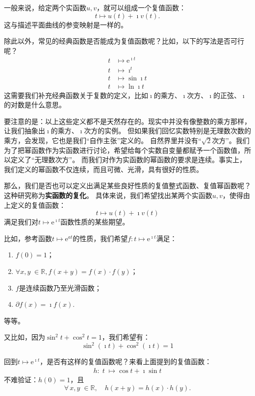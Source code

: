 \documentclass[12pt,UTF8]{ctexbook}
\newcommand{\e}{\mathrm{e}}
\theoremstyle{definition}
\theoremstyle{plain}
\begin{document}
一般来说，给定两个实函数$u,v$，就可以组成一个复值函数：
$$ t\mapsto u(t) + \imath v(t).$$
这与描述平面曲线的参变映射是一样的。

除此以外，常见的经典函数是否能成为复值函数呢？比如，以下的写法是否可行呢？
\begin{align*}
    t &\mapsto \e^{\imath t} \\
    t &\mapsto \imath^t \\
    t &\mapsto \sin{\imath t} \\
    t &\mapsto \ln{\imath t} 
\end{align*}
这需要我们补充经典函数关于复数的定义，比如$\imath$的乘方、$\imath$次方、$\imath$的正弦、$\imath$的对数是什么意思。

要注意的是：以上这些定义都不是天然存在的。现实中并没有像整数的乘方那样，让我们抽象出$\imath$的乘方、$\imath$次方的实例。
但如果我们回忆实数特别是无理数次数的乘方，会发现，它也是我们“自作主张”定义的。
自然界里并没有“$\sqrt{2}$次方”。我们为了把幂函数作为实函数进行讨论，希望给每个实数自变量都赋予一个函数值，所以定义了“无理数次方”。
而我们对作为实函数的幂函数的要求是连续。事实上，我们定义的幂函数不仅连续，而且可微、光滑，具有很好的性质。

那么，我们是否也可以定义出满足某些良好性质的复值整式函数、复值幂函数呢？这种研究称为\textbf{实函数的复化}。
具体来说，我们希望找出某两个实函数$u,v$，使得由上定义的复值函数：
$$ t\mapsto u(t) + \imath v(t)$$
满足我们对$t\mapsto \e^{\imath t}$函数性质的某些期望。

比如，参考函数$t\mapsto \e^{at}$的性质，我们希望$f: t\mapsto \e^{\imath t}$满足：
\begin{enumerate}
    \item $f(0) = 1$；
    \item $\forall x, y \; \in \mathbb{R}, f(x + y) = f(x)\cdot f(y)$；
    \item $f$是连续函数乃至光滑函数；
    \item $\partial f(x) = \imath f(x).$
\end{enumerate}
等等。

又比如，因为$\sin^2{t} + \cos^2{t} = 1$，我们希望有：
$$ \sin^2{(\imath t)} + \cos^2{(\imath t)} = 1 $$

回到$t\mapsto \e^{\imath t}$，是否有这样的复值函数呢？来看上面提到的复值函数：
\begin{align*}
    h: \;t \;\mapsto \cos{t} + \imath \sin{t}
\end{align*}
不难验证：$h(0) = 1$，且
$$ \forall \, x, y\; \in \mathbb{R}, \quad h(x + y) = h(x)\cdot h(y).$$
\end{document}
